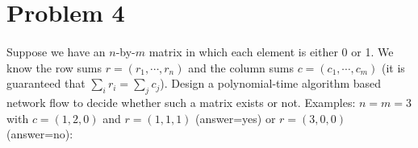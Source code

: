 \documentclass[a4paper]{article}
\begin{document}
\section*{Problem 4}
\paragraph{}
Suppose we have an $n$-by-$m$ matrix in which each element is either 0 or 1. We know the row sums
$r=(r_{1},\cdots,r_{n})$ and the column sums $c=(c_{1},\cdots,c_{m})$ (it is guaranteed that
$\sum_{i}r_{i}=\sum_{j}c_{j}$). Design a
polynomial-time algorithm based network flow to decide whether such a matrix exists or not.
Examples: $n=m=3$ with $c = (1, 2, 0)$ and $r = (1, 1, 1)$ (answer=yes) or $r = (3, 0, 0)$ (answer=no):
\begin{table}[H]
  \centering
  \qquad\quad
\end{table}
\end{document}
